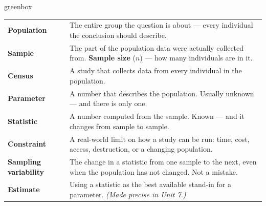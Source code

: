 \documentclass[10pt]{article}
\begin{document}
\boxguard[24]
\begin{skillbox}{greenbox}
\small
\renewcommand{\arraystretch}{1.35}
\begin{tabularx}{\linewidth}{@{} >{\bfseries}p{3.1cm} X @{}}
Population & The entire group the question is about --- every individual the conclusion should
       describe. \\
Sample & The part of the population data were actually collected from. \textbf{Sample size}
       ($n$) --- how many individuals are in it. \\
Census & A study that collects data from every individual in the population. \\
Parameter & A number that describes the population. Usually unknown --- and there is only one. \\
Statistic & A number computed from the sample. Known --- and it changes from sample to sample. \\
Constraint & A real-world limit on how a study can be run: time, cost, access, destruction, or
       a changing population. \\
Sampling variability & The change in a statistic from one sample to the next, even when the
       population has not changed. Not a mistake. \\
Estimate & Using a statistic as the best available stand-in for a parameter. \emph{(Made
       precise in Unit 7.)} \\
\end{tabularx}
\end{skillbox}
\end{document}
